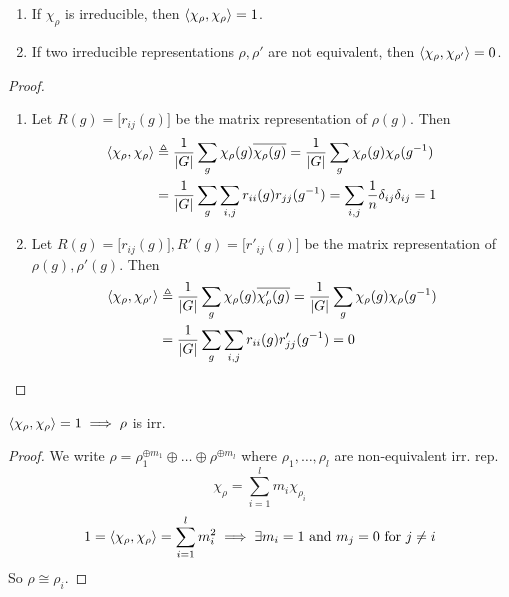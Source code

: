 \begin{prop} \mbox{}
  \begin{enumerate}
    \item If $\chi_\rho$ is irreducible, then $\langle\chi_\rho, \chi_\rho\rangle = 1$.
    \item If two irreducible representations $\rho, \rho'$ are not equivalent, then
      $\langle\chi_\rho, \chi_{\rho'}\rangle = 0$.
  \end{enumerate}

  \begin{proof} \mbox{}
    \begin{enumerate}
      \item
        Let $R(g) = \big[ r_{ij}(g) \big]$ be the matrix representation of $\rho(g)$. Then
        \begin{align*}
          \langle\chi_\rho, \chi_{\rho}\rangle &\triangleq \frac{1}{\lvert G\rvert} \sum_g \chi_\rho(g) 
          \overline{\chi_\rho(g)} = \frac{1}{\lvert G\rvert} \sum_g \chi_\rho(g) \chi_\rho(g^{-1}) \\
          &= \frac{1}{\lvert G\rvert} \sum_g \sum_{i, j} r_{ii}(g) r_{jj}(g^{-1})
          = \sum_{i, j} \frac{1}{n} \delta_{ij} \delta_{ij} = 1
        \end{align*}
      \item 
        Let $R(g) = \big[ r_{ij}(g) \big], R'(g) = \big[ r'_{ij}(g) \big]$
        be the matrix representation of $\rho(g), \rho'(g)$. Then
        \begin{align*}
          \langle\chi_\rho, \chi_{\rho'}\rangle 
          &\triangleq \frac{1}{\lvert G\rvert} \sum_g \chi_\rho(g) \overline{\chi_\rho'(g)}
          = \frac{1}{\lvert G\rvert} \sum_g \chi_\rho(g) \chi_\rho(g^{-1}) \\
          &= \frac{1}{\lvert G\rvert} \sum_g \sum_{i, j} r_{ii}(g) r'_{jj}(g^{-1})
          = 0
        \end{align*}
    \end{enumerate}
  \end{proof}
\end{prop}

\begin{remark}
  $\langle\chi_\rho,\chi_\rho\rangle = 1 \implies \rho$ is irr.
  \begin{proof}
    We write $\rho = \rho_1^{\oplus m_1}\oplus\dots\oplus\rho^{\oplus m_l}$
    where $\rho_1, \dots, \rho_l$ are non-equivalent irr. rep.
    \[ \chi_\rho = \sum_{i=1}^l m_i \chi_{\rho_i} \]
    \[
      1 = \langle\chi_\rho, \chi_\rho\rangle = \sum_{i=1}^l m_i^2
      \implies \exists m_i = 1 \text{~and~} m_j = 0 \text{~for~} j \ne i
    \]
    So $\rho \cong \rho_i$.
  \end{proof}
\end{remark}
